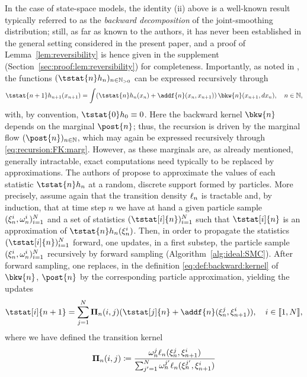 In the case of state-space models, the identity (ii) above is a well-known result typically referred to as the \emph{backward decomposition} of the joint-smoothing distribution; still, as far as known to the authors, it has never been established in the general setting considered in the present paper, and a proof of Lemma~\ref{lem:reversibility} is hence given in the supplement (Section~\ref{sec:proof:lem:reversibility}) for completeness. Importantly, as noted in \cite{cappe:2009}, the functions $(\tstat{n} h_n)_{n \in \nsetpos}$ can be expressed recursively through  
\begin{equation} \label{eq:forward:smoothing}
\tstat{n + 1} h_{n + 1}(x_{n + 1}) = \int (\tstat{n} h_n(x_n) + \addf{n}(x_n, x_{n + 1})) \, \bkw{n}(x_{n + 1}, \rmd x_n), \quad n \in \nset, 
\end{equation}
with, by convention, $\tstat{0} h_0 \equiv 0$. Here the backward kernel $\bkw{n}$ depends on the marginal $\post{n}$; thus, the recursion is driven by the marginal flow $(\post{n})_{n \in \nset}$, which may again be expressed recursively through \eqref{eq:recursion:FK:marg}. However, as these marginals are, as already mentioned, generally intractable, exact computations need typically to be replaced by approximations. The authors of \cite{delmoral:doucet:singh:2010} propose to approximate the values of each statistic $\tstat{n} h_n$ at a random, discrete support formed by particles. More precisely, assume again that the transition density $\ell_{n}$ is tractable and, by induction, that at time step $n$ we have at hand a given particle sample $(\xi_{n}^{i}, \omega_{n}^{i})_{i = 1}^N$ and a set of statistics $(\tstat[i]{n})_{i = 1}^\N$ such that $\tstat[i]{n}$ is an approximation of $\tstat{n} h_n(\epart{n}{i})$. Then, in order to propagate the statistics $(\tstat[i]{n})_{i = 1}^\N$ forward, one updates, in a first substep, the particle sample $(\xi_{n}^{i}, \omega_{n}^{i})_{i = 1}^N$ recursively by forward sampling (Algorithm~\ref{alg:ideal:SMC}). After forward sampling, one replaces, in the definition \eqref{eq:def:backward:kernel} of $\bkw{n}$, $\post{n}$ by the corresponding particle approximation, yielding the updates 
\begin{equation} \label{eq:tstat:FFBSm:update}
\tstat[i]{n + 1} = \sum_{j = 1}^\N \trm{n}(i, j) (\tstat[j]{n} + \addf{n}(\epart{n}{j}, \epart{n + 1}{i})), \quad i \in \intvect{1}{\N}, 
\end{equation} 
where we have defined the transition kernel  
\begin{equation} \label{eq:def:trm}
\trm{n}(i, j) \eqdef \frac{\ewght{n}{j} \ud{n}(\epart{n}{j}, \epart{n + 1}{i})}{\sum_{j' = 1}^\N \ewght{n}{j'} \ud{n}(\epart{n}{j'}, \epart{n + 1}{i})}
\end{equation}

